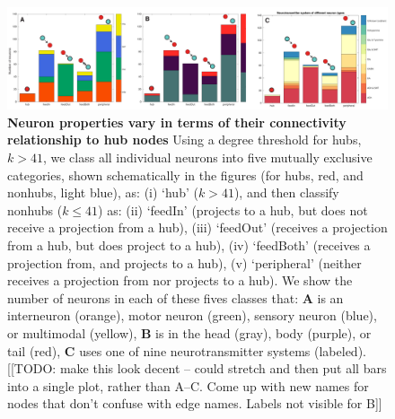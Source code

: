 \documentclass[10pt,letterpaper]{article}
\begin{document}
\begin{figure}[h]
\centering
    \includegraphics[width=1\textwidth]{FeedInOutNodes.pdf}
\caption{
\textbf{Neuron properties vary in terms of their connectivity relationship to hub nodes}
Using a degree threshold for hubs, $k>41$, we class all individual neurons into five mutually exclusive categories, shown schematically in the figures (for hubs, red, and nonhubs, light blue), as:
(i) `hub' ($k>41$),
and then classify nonhubs ($k\leq41$) as:
(ii) `feedIn' (projects to a hub, but does not receive a projection from a hub),
(iii) `feedOut' (receives a projection from a hub, but does project to a hub),
(iv) `feedBoth' (receives a projection from, and projects to a hub),
(v) `peripheral' (neither receives a projection from nor projects to a hub).
We show the number of neurons in each of these fives classes that:
\textbf{A} is an interneuron (orange), motor neuron (green), sensory neuron (blue), or multimodal (yellow),
\textbf{B} is in the head (gray), body (purple), or tail (red),
\textbf{C} uses one of nine neurotransmitter systems (labeled).
\label{fig:S_feedInOutNodes}
[[TODO: make this look decent -- could stretch and then put all bars into a single plot, rather than A--C. Come up with new names for nodes that don't confuse with edge names. Labels not visible for B]]
}
\end{figure}
\end{document}
